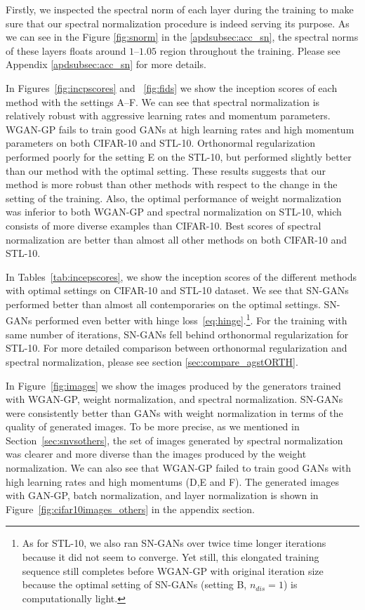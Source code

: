 Firstly, we inspected the spectral norm of each layer during the training to make sure that our spectral normalization procedure is indeed serving its purpose. As we can see in the Figure \ref{fig:snorm} in the \ref{apdsubsec:acc_sn}, the spectral norms of these layers floats around $1$--$1.05$ region throughout the training. Please see Appendix \ref{apdsubsec:acc_sn} for more details.

In Figures~\ref{fig:incpscores} and ~\ref{fig:fids} we show the inception scores of each method with the settings A--F. We can see that spectral normalization is relatively robust with aggressive learning rates and momentum parameters. WGAN-GP fails to train good GANs at high learning rates and high momentum parameters on both CIFAR-10 and STL-10. Orthonormal regularization performed poorly for the setting E on the STL-10, but performed slightly better than our method with the optimal setting. These results suggests that our method is more robust than other methods with respect to the change in the setting of the training. Also, the optimal performance of weight normalization was inferior to both WGAN-GP and spectral normalization on STL-10, which consists of more diverse examples than CIFAR-10. Best scores of spectral normalization are better than almost all other methods on both CIFAR-10 and STL-10.

In Tables~\ref{tab:incepscores}, we show the inception scores of the different methods with optimal settings on CIFAR-10 and STL-10 dataset. We see that SN-GANs performed better than almost all contemporaries on the optimal settings. SN-GANs performed even better with hinge loss~\eqref{eq:hinge}.\footnote{As for STL-10, we also ran SN-GANs over twice time longer iterations because it did not seem to converge. Yet still, this elongated training sequence still completes before WGAN-GP with original iteration size because the optimal setting of SN-GANs (setting B, $n_{dis} =1$) is computationally light.}. For the training with same number of iterations, SN-GANs fell behind orthonormal regularization for STL-10. For more detailed comparison between orthonormal regularization and spectral normalization, please see section \ref{sec:compare_agstORTH}. 

In Figure~\ref{fig:images} we show the images produced by the generators trained with WGAN-GP, weight normalization, and spectral normalization. SN-GANs were consistently better than GANs with weight normalization in terms of the quality of generated images. To be more precise, as we mentioned in Section~\ref{sec:snvsothers}, the set of images generated by spectral normalization was clearer and more diverse than the images produced by the weight normalization. We can also see that WGAN-GP failed to train good GANs with high learning rates and high momentums (D,E and F). The generated images with GAN-GP, batch normalization, and layer normalization is shown in Figure~\ref{fig:cifar10images_others} in the appendix section.

